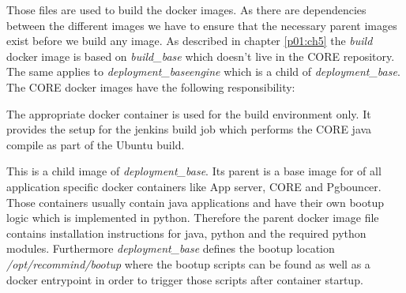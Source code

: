 		Those files are used to build the docker images. As there are dependencies between the different images we have to ensure that the necessary parent images exist before we build any image. As described in chapter \ref{p01:ch5} the \emph{build} docker image is based on \emph{build\_base} which doesn't live in the CORE repository. The same applies to \emph{deployment\_baseengine} which is a child of \emph{deployment\_base}. The CORE docker images have the following responsibility:
		\begin{description}\sloppy
			\item[build] The appropriate docker container is used for the build environment only. It provides the setup for the jenkins build job which performs the CORE java compile as part of the Ubuntu build.
			\item[deployment\_baseengine] This is a child image of \emph{deployment\_base}. Its parent is a base image for of all application specific docker containers like App server, CORE and Pgbouncer. Those containers usually contain java applications and have their own bootup logic which is implemented in python. Therefore the parent docker image file contains installation instructions for java, python and the required python modules. Furthermore \emph{deployment\_base} defines the bootup location \emph{/opt/recommind/bootup} where the bootup scripts can be found as well as a docker entrypoint in order to trigger those scripts after container startup.
			

\end{description}

